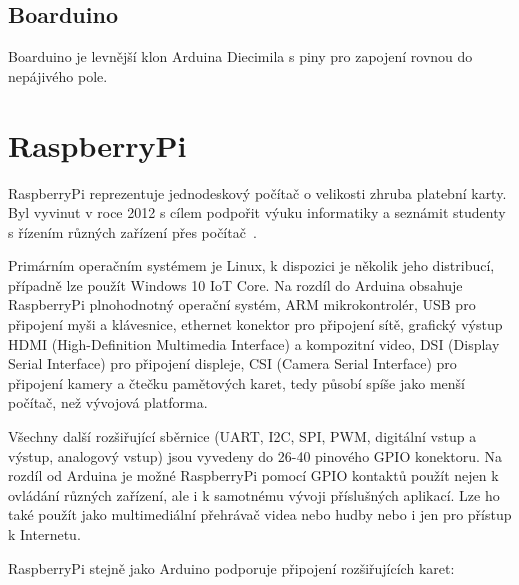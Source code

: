 	\subsection{Boarduino} 
	Boarduino je levnější klon Arduina Diecimila s piny pro zapojení rovnou do nepájivého pole.



\section{RaspberryPi}
\label{KapRaspi}

RaspberryPi reprezentuje jednodeskový počítač o velikosti zhruba platební karty. Byl vyvinut v roce 2012 s cílem podpořit výuku informatiky a seznámit studenty s řízením různých zařízení přes počítač~\cite{Raspi}. 

Primárním operačním systémem je Linux, k dispozici je několik jeho distribucí, případně lze použít Windows 10 IoT Core. Na rozdíl do Arduina obsahuje RaspberryPi plnohodnotný operační systém, ARM mikrokontrolér, USB pro připojení myši a klávesnice, ethernet konektor pro připojení sítě, grafický výstup HDMI (High-Definition Multimedia Interface) a kompozitní video, DSI (Display Serial Interface) pro připojení displeje, CSI (Camera Serial Interface) pro připojení kamery a čtečku pamětových karet, tedy působí spíše jako menší počítač, než vývojová platforma. 

Všechny další rozšiřující sběrnice (UART, I2C, SPI, PWM, digitální vstup a výstup, analogový vstup) jsou vyvedeny do 26-40 pinového GPIO konektoru. Na rozdíl od Arduina je možné RaspberryPi pomocí GPIO kontaktů použít nejen k ovládání různých zařízení, ale i k samotnému vývoji příslušných aplikací. Lze ho také použít jako multimediální přehrávač videa nebo hudby nebo i jen pro přístup k Internetu.

RaspberryPi stejně jako Arduino podporuje připojení rozšiřujících karet:

